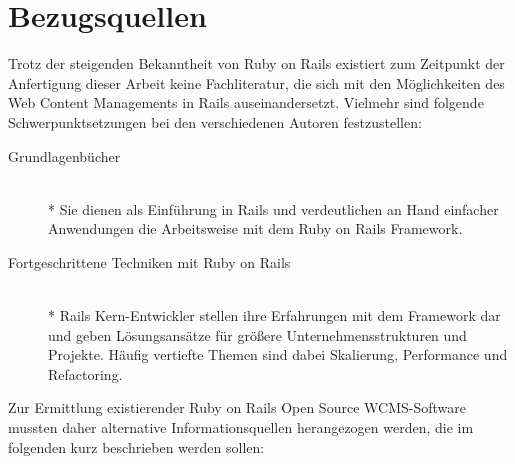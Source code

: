 \section{Bezugsquellen}

Trotz der steigenden Bekanntheit von Ruby on Rails existiert zum Zeitpunkt der Anfertigung dieser Arbeit keine Fachliteratur, die sich mit den Möglichkeiten des Web Content Managements in Rails auseinandersetzt. Vielmehr sind folgende Schwerpunktsetzungen bei den verschiedenen Autoren festzustellen:
\begin{description}
\item[Grundlagenbücher]\mbox{~}\\*
Sie dienen als Einführung in Rails und verdeutlichen an Hand einfacher Anwendungen die Arbeitsweise mit dem Ruby on Rails Framework.
\item[Fortgeschrittene Techniken mit Ruby on Rails]\mbox{~}\\*
Rails Kern-Entwickler stellen ihre Erfahrungen mit dem Framework dar und geben Lösungsansätze für größere Unternehmensstrukturen und Projekte. Häufig vertiefte Themen sind dabei Skalierung, Performance und Refactoring.
\end{description}
Zur Ermittlung existierender Ruby on Rails Open Source WCMS-Software mussten daher alternative Informationsquellen herangezogen werden, die im folgenden kurz beschrieben werden sollen:
